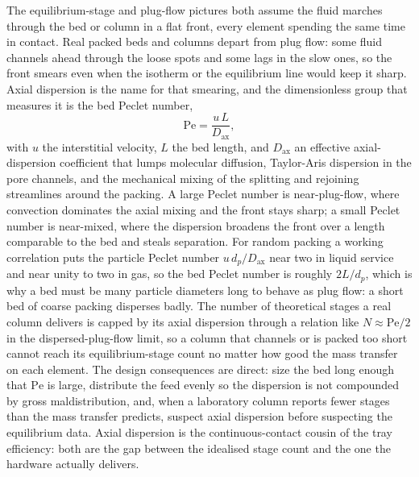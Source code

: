 \begin{mastery}
The equilibrium-stage and plug-flow pictures both assume the fluid marches
through the bed or column in a flat front, every element spending the same
time in contact. Real packed beds and columns depart from plug flow: some
fluid channels ahead through the loose spots and some lags in the slow ones,
so the front smears even when the isotherm or the equilibrium line would keep
it sharp. Axial dispersion is the name for that smearing, and the
dimensionless group that measures it is the bed Peclet number,
\[
\mathrm{Pe} = \frac{u\,L}{D_{\text{ax}}},
\]
with $u$ the interstitial velocity, $L$ the bed length, and $D_{\text{ax}}$ an
effective axial-dispersion coefficient that lumps molecular diffusion,
Taylor-Aris dispersion in the pore channels, and the mechanical mixing of the
splitting and rejoining streamlines around the packing. A large Peclet number
is near-plug-flow, where convection dominates the axial mixing and the front
stays sharp; a small Peclet number is near-mixed, where the dispersion broadens
the front over a length comparable to the bed and steals separation. For
random packing a working correlation puts the particle Peclet number
$u\,d_p/D_{\text{ax}}$ near two in liquid service and near unity to two in gas,
so the bed Peclet number is roughly $2L/d_p$, which is why a bed must be many
particle diameters long to behave as plug flow: a short bed of coarse packing
disperses badly. The number of theoretical stages a real column delivers is
capped by its axial dispersion through a relation like $N \approx \mathrm{Pe}/2$
in the dispersed-plug-flow limit, so a column that channels or is packed too
short cannot reach its equilibrium-stage count no matter how good the mass
transfer on each element. The design consequences are direct: size the bed
long enough that $\mathrm{Pe}$ is large, distribute the feed evenly so the
dispersion is not compounded by gross maldistribution, and, when a
laboratory column reports fewer stages than the mass transfer predicts,
suspect axial dispersion before suspecting the equilibrium data. Axial
dispersion is the continuous-contact cousin of the tray efficiency: both are
the gap between the idealised stage count and the one the hardware actually
delivers.
\end{mastery}

